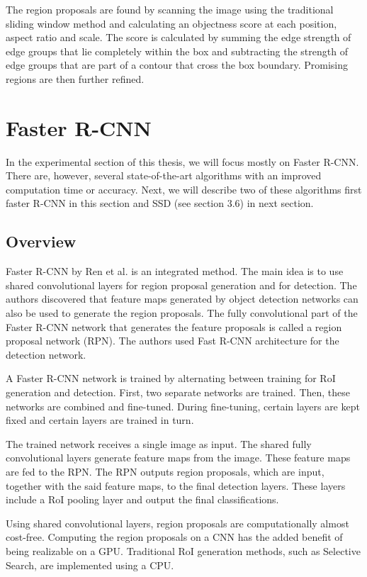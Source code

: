 The region proposals are found by scanning the image using the traditional sliding window method and calculating an objectness score at each position, aspect ratio and scale. The score is calculated by summing the edge strength of edge groups that lie completely within the box and subtracting the strength of edge groups that are part of a contour that cross the box boundary. Promising regions are then further refined.


\section{Faster R-CNN}
In the experimental section of this thesis, we will focus mostly on Faster R-CNN. There are, however, several state-of-the-art algorithms with an improved computation time or accuracy. Next, we will describe two of these algorithms first faster R-CNN in this section and SSD (see section 3.6) in next section.

\subsection{Overview}
Faster R-CNN by Ren et al. is an integrated method. The main idea is to use shared convolutional layers for region proposal generation and for detection. The authors discovered that feature maps generated by object detection networks can also be used to generate the region proposals. The fully convolutional part of the Faster R-CNN network that generates the feature proposals is called a region proposal network (RPN). The authors used Fast R-CNN architecture for the detection network.

A Faster R-CNN network is trained by alternating between training for RoI generation and detection. First, two separate networks are trained. Then, these networks are combined and fine-tuned. During fine-tuning, certain layers are kept fixed and certain layers are trained in turn.

The trained network receives a single image as input. The shared fully convolutional layers generate feature maps from the image. These feature maps are fed to the RPN. The RPN outputs region proposals, which are input, together with the said feature maps, to the final detection layers. These layers include a RoI pooling layer and output the final classifications.

Using shared convolutional layers, region proposals are computationally almost cost-free. Computing the region proposals on a CNN has the added benefit of being realizable on a GPU. Traditional RoI generation methods, such as Selective Search, are implemented using a CPU.

